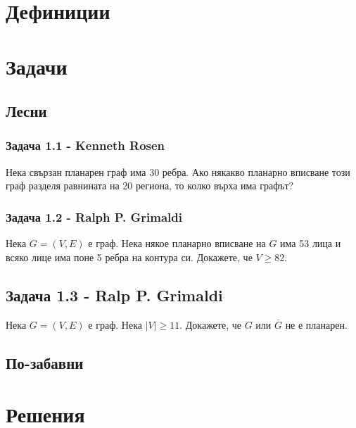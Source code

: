 \documentclass[12pt]{article}
\begin{document}
\section*{Дефиниции}

\section*{Задачи}

\subsection*{Лесни}
\subsubsection*{Задача 1.1 - Kenneth Rosen}
Нека свързан планарен граф има 30 ребра. Ако някакво планарно вписване този граф разделя равнината на 20 региона, то колко върха има графът?
\subsubsection*{Задача 1.2 - Ralph P. Grimaldi}
Нека $G = (V, E)$ е граф. Нека някое планарно вписване на $G$ има 53 лица и всяко лице има поне 5 ребра на контура си. Докажете, че $V \geq 82$.
\subsection*{Задача 1.3 - Ralp P. Grimaldi}
Нека $G = (V, E)$ е граф. Нека $|V| \geq 11$. Докажете, че $G$ или $\overline{G}$ не е планарен.

\subsection*{По-забавни}

\section*{Решения}
\end{document}
